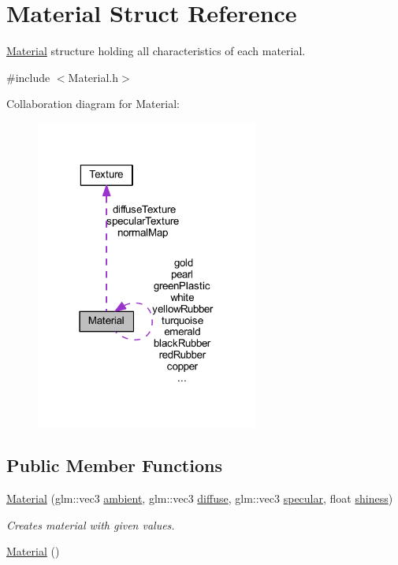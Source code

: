 \hypertarget{struct_material}{}\section{Material Struct Reference}
\label{struct_material}


\mbox{\hyperlink{struct_material}{Material}} structure holding all characteristics of each material.  




{\ttfamily \#include $<$Material.\+h$>$}



Collaboration diagram for Material\+:\nopagebreak
\begin{figure}[H]
\begin{center}
\leavevmode
\includegraphics[width=207pt]{struct_material__coll__graph}
\end{center}
\end{figure}
\subsection*{Public Member Functions}
\begin{DoxyCompactItemize}
\item 
\mbox{\hyperlink{struct_material_a0be7dba7f259e659502c4b543cdd7d8c}{Material}} (glm\+::vec3 \mbox{\hyperlink{struct_material_af99c823542e497c98a35d1aac5fc9012}{ambient}}, glm\+::vec3 \mbox{\hyperlink{struct_material_a099904e2f5a7bbec3cba6bf8ec546b11}{diffuse}}, glm\+::vec3 \mbox{\hyperlink{struct_material_aac1c499923ff99564cdd97a4b5e504a9}{specular}}, float \mbox{\hyperlink{struct_material_ac40b4d892e9bff09f793d86ca1f3257e}{shiness}})
\begin{DoxyCompactList}\small\item\em Creates material with given values. \end{DoxyCompactList}\item 
\mbox{\hyperlink{struct_material_a137e987401b63eb7c6c27c3e38bc74b5}{Material}} ()
\end{DoxyCompactItemize}
